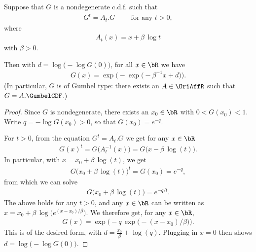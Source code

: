 \begin{lemma}[Self-similar continuous c.d.f. family characterization $\gamma = 0$]
  \label{lem:characterization-self-similar-family-zero-index}
  \leanok
  Suppose that $G$ is a nondegenerate c.d.f. such that
  \begin{align*}
    G^{t} = A_t . G \qquad \text{ for any } t > 0 ,
  \end{align*}
  where
  \begin{align*}
    A_t(x) = x + \beta \, \log t
  \end{align*}
  with $\beta > 0$.

  Then with $d = \log \big(-\log G(0) \big)$,
  for all $x \in \bR$ we have
  \begin{align*}
    G(x) = \exp \Big( - \exp \big( -\beta^{-1} x + d \big) \Big) .
  \end{align*}
  (In particular, $G$ is of Gumbel type: there exists an $A \in \OriAffR$
  such that $G = A.\GumbelCDF$.)
\end{lemma}
\begin{proof}

  Since $G$ is nondegenerate, there exists an $x_0 \in \bR$
  with $0 < G(x_0) < 1$. Write $q = -\log G(x_0) > 0$,
  so that $G(x_0) = e^{-q}$.

  For $t > 0$, from the equation $G^{t} = A_t . G$
  we get for any $x \in \bR$
  \begin{align*}
  G(x)^t = G \big( A_t^{-1}(x) \big) = G \big( x - \beta \, \log(t) \big) .
  \end{align*}
  In particular, with $x = x_0 + \beta \, \log(t)$, we get
  \begin{align*}
    G\big( x_0 + \beta \, \log(t) \big)^{t} = G(x_0) = e^{- q},
  \end{align*}
  from which we can solve
  \begin{align*}
    G\big( x_0 + \beta \, \log(t) \big) = e^{-q/t} .
  \end{align*}
  The above holds for any $t>0$, and any $x \in \bR$
  can be written as $x = x_0 + \beta \, \log\big( e^{(x - x_0)/\beta} \big)$.
  We therefore get, for any $x \in \bR$,
  \begin{align*}
    G(x) = \exp \Big( - q \, \exp \big( -(x-x_0)/\beta \big) \Big) .
  \end{align*}
  This is of the desired form, with $d = \frac{x_0}{\beta} + \log(q)$.
  Plugging in $x = 0$ then shows $d = \log \big(-\log G(0) \big)$.
\end{proof}

